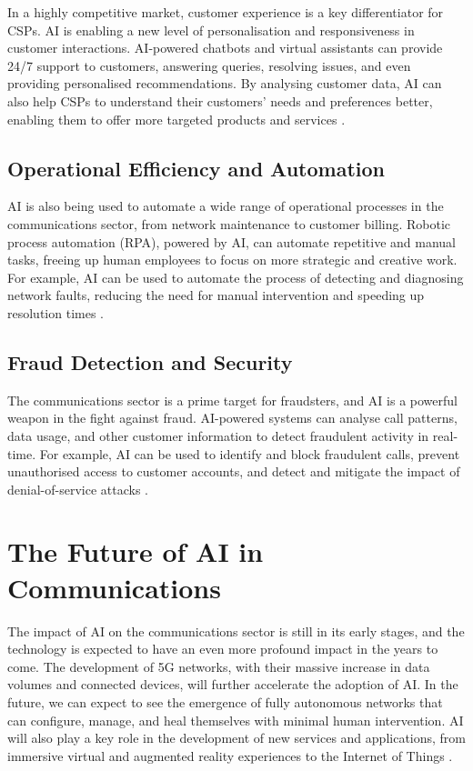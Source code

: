 In a highly competitive market, customer experience is a key differentiator for CSPs. AI is enabling a new level of personalisation and responsiveness in customer interactions. AI-powered chatbots and virtual assistants can provide 24/7 support to customers, answering queries, resolving issues, and even providing personalised recommendations. By analysing customer data, AI can also help CSPs to understand their customers' needs and preferences better, enabling them to offer more targeted products and services \parencite{dimcheva2024opportunities}.

\subsection{Operational Efficiency and Automation}

AI is also being used to automate a wide range of operational processes in the communications sector, from network maintenance to customer billing. Robotic process automation (RPA), powered by AI, can automate repetitive and manual tasks, freeing up human employees to focus on more strategic and creative work. For example, AI can be used to automate the process of detecting and diagnosing network faults, reducing the need for manual intervention and speeding up resolution times \parencite{kumar2019role}.

\subsection{Fraud Detection and Security}

The communications sector is a prime target for fraudsters, and AI is a powerful weapon in the fight against fraud. AI-powered systems can analyse call patterns, data usage, and other customer information to detect fraudulent activity in real-time. For example, AI can be used to identify and block fraudulent calls, prevent unauthorised access to customer accounts, and detect and mitigate the impact of denial-of-service attacks \parencite{wef2020impact}.

\section{The Future of AI in Communications}

The impact of AI on the communications sector is still in its early stages, and the technology is expected to have an even more profound impact in the years to come. The development of 5G networks, with their massive increase in data volumes and connected devices, will further accelerate the adoption of AI. In the future, we can expect to see the emergence of fully autonomous networks that can configure, manage, and heal themselves with minimal human intervention. AI will also play a key role in the development of new services and applications, from immersive virtual and augmented reality experiences to the Internet of Things \parencite{dimcheva2024opportunities}.


